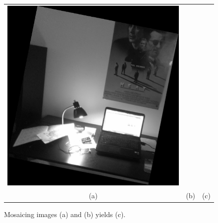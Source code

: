 \documentclass[11pt]{article} %
\begin{document}
\begin{figure}[H]
\begin{tabular}{ccc}
			\includegraphics[scale=.25]{figures/room_mosaic2} \\ 
		(a) & (b) & (c)
	\end{tabular}
	\caption{Mosaicing images (a) and (b) yields (c).}
	\label{fig:mosaic2Pair2}
\end{figure}
\end{document}

